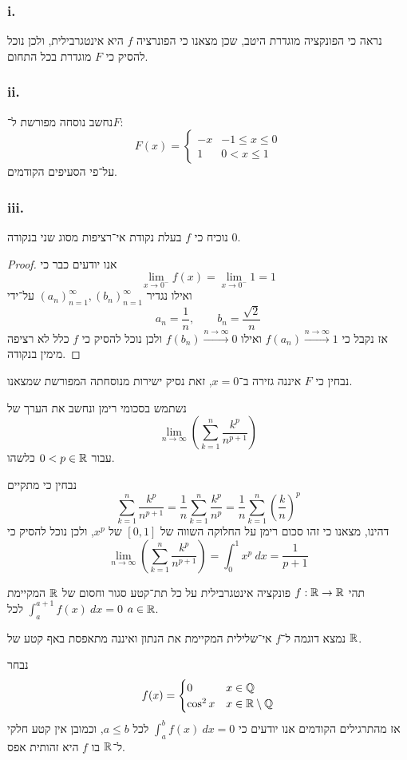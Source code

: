 \subsubsection{i.}
נראה כי הפונקציה מוגדרת היטב, שכן מצאנו כי הפונרציה $f$ היא אינטגרבילית, ולכן נוכל להסיק כי $F$ מוגדרת בכל התחום.

\subsubsection{ii.}
נחשב נוסחה מפורשת ל־$F$:
\[
	F(x) = \begin{cases}
		-x & -1 \le x \le 0 \\
		1 & 0 < x \le 1
	\end{cases}
\]
על־פי הסעיפים הקודמים.

\subsubsection{iii.}
נוכיח כי $f$ בעלת נקודת אי־רציפות מסוג שני בנקודה $0$.
\begin{proof}
	אנו יודעים כבר כי
	\[
		\lim_{x \to 0^-} f(x)
		= \lim_{x \to 0^-} 1
		= 1
	\]
	ואילו נגדיר ${(a_n)}_{n = 1}^\infty, {(b_n)}_{n = 1}^\infty$ על־ידי
	\[
		a_n = \frac{1}{n},
		\qquad
		b_n = \frac{\sqrt{2}}{n}
	\]
	אז נקבל כי $f(a_n) \xrightarrow{n \to \infty} 1$ ואילו $f(b_n) \xrightarrow{n \to \infty} 0$ ולכן נוכל להסיק כי $f$ כלל לא רציפה מימין בנקודה.
\end{proof}
נבחין כי $F$ איננה גזירה ב־$x = 0$, זאת נסיק ישירות מנוסחתה המפורשת שמצאנו.

\Question{}
נשתמש בסכומי רימן ונחשב את הערך של
\[
	\lim_{n \to \infty} \left( \sum_{k = 1}^{n} \frac{k^p}{n^{p + 1}} \right)
\]
עבור $0 < p \in \mathbb{R}$ כלשהו.

נבחין כי מתקיים
\[
	\sum_{k = 1}^{n} \frac{k^p}{n^{p + 1}}
	= \frac{1}{n} \sum_{k = 1}^{n} \frac{k^p}{n^p}
	= \frac{1}{n} \sum_{k = 1}^{n} {(\frac{k}{n})}^p
\]
דהינו, מצאנו כי זהו סכום רימן על החלוקה השווה של $[0, 1]$ של $x^p$, ולכן נוכל להסיק כי
\[
	\lim_{n \to \infty} \left( \sum_{k = 1}^{n} \frac{k^p}{n^{p + 1}} \right)
	= \int_{0}^{1} x^p\ dx
	= \frac{1}{p + 1}
\]

\Question{}
תהי $f : \mathbb{R} \to \mathbb{R}$ פונקציה אינטגרבילית על כל תת־קטע סגור וחסום של $\mathbb{R}$ המקיימת $\int_{a}^{a + 1} f(x)\ dx = 0$ לכל $a \in \mathbb{R}$.

\Subquestion{}
נמצא דוגמה ל־$f$ אי־שלילית המקיימת את הנתון ואיננה מתאפסת באף קטע של $\mathbb{R}$.

נבחר
\[
	f(x) = \begin{cases}
		0 & x \in \mathbb{Q} \\
		\cos^2 x & x \in \mathbb{R} \setminus \mathbb{Q}
	\end{cases}
\]
אז מהתרגילים הקודמים אנו יודעים כי $\int_{a}^{b} f(x)\ dx = 0$ לכל $a \le b$, וכמובן אין קטע חלקי ל־$\mathbb{R}$ בו $f$ היא זהותית אפס.


